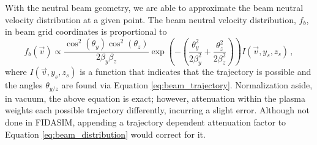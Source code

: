 With the neutral beam geometry, we are able to approximate the beam neutral velocity distribution at a given point. The beam neutral velocity distribution, $f_b$, in beam grid coordinates is proportional to
\begin{equation}\label{eq:beam_distribution}
    f_b(\vec{v}) \propto \frac{\cos^2(\theta_y)\cos^2(\theta_z)}{2\beta_y\beta_z}\exp\left(-\left(\frac{\theta_y^2}{2\beta_y^2} + \frac{\theta_z^2}{2\beta_z^2}\right)\right)I(\vec{v},y_s,z_s)\,,
\end{equation}
where $I(\vec{v},y_s,z_s)$ is a function that indicates that the trajectory is possible and the angles $\theta_{y/z}$ are found via Equation \ref{eq:beam_trajectory}. Normalization aside, in vacuum, the above equation is exact; however, attenuation within the plasma weights each possible trajectory differently, incurring a slight error. Although not done in FIDASIM, appending a trajectory dependent attenuation factor to Equation \ref{eq:beam_distribution} would correct for it.

